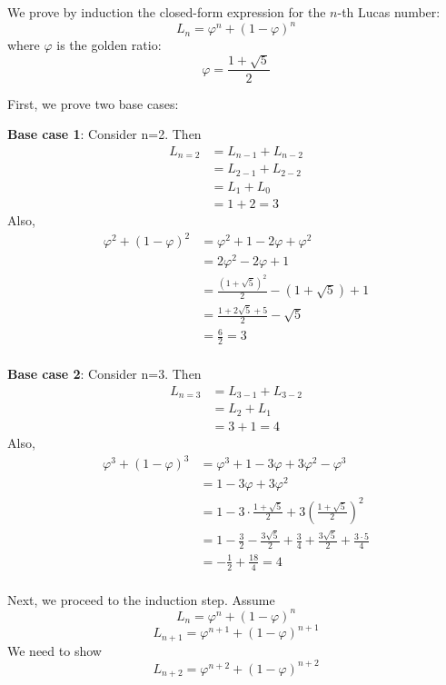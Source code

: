 \documentclass[paper=a4, fontsize=11pt]{scrartcl} %
\numberwithin{equation}{section} %
\numberwithin{figure}{section} %
\numberwithin{table}{section} %
\begin{document}
We prove by induction the closed-form expression for the $n$-th Lucas number:
\[L_n = \varphi^n + (1-\varphi)^n\]
where $\varphi$ is the golden ratio:
\[\varphi = \frac{1 + \sqrt{5}}{2}\]

First, we prove two base cases:

\textbf{Base case 1}: Consider n=2. Then
\begin{align*}
L_{n = 2} &= L_{n - 1} + L_{n - 2} \\
	&= L_{2 - 1} + L_{2 - 2} \\
	&= L_{1} + L_{0} \\
	&= 1 + 2 = 3
\end{align*}
Also, 
\begin{align*}
\varphi^2 + (1-\varphi)^2 &= \varphi^2 + 1 - 2\varphi + \varphi^2 \\ 
	&= 2\varphi^2 - 2\varphi + 1 \\
	&= \frac{(1+\sqrt{5})^2}{2} - (1+\sqrt{5}) + 1 \\
	&= \frac{1+2\sqrt{5} +5}{2} - \sqrt{5} \\
	&= \frac{6}{2} = 3\\
\end{align*}

\textbf{Base case 2}: Consider n=3. Then
\begin{align*}
L_{n = 3} &= L_{3 - 1} + L_{3 - 2} \\
	&= L_{2} + L_{1} \\
	&= 3 + 1 = 4
\end{align*}
Also, 
\begin{align*}
\varphi^3 + (1-\varphi)^3 &= \varphi^3 + 1 - 3\varphi + 3\varphi^2 - \varphi^3 \\ 
	&= 1 - 3\varphi +3 \varphi^2 \\
	&= 1 - 3 \cdot \frac{1+\sqrt{5}}{2} + 3 \left(\frac{1+\sqrt{5}}{2}\right)^2 \\
	&= 1 - \frac{3}{2} - \frac{3\sqrt{5}}{2} +\frac{3}{4} + \frac{3\sqrt{5}}{2} + \frac{3\cdot5}{4} \\
	&= -\frac{1}{2} + \frac{18}{4} = 4\\
\end{align*}

Next, we proceed to the induction step. Assume
\[L_{n} = \varphi^n + (1 - \varphi)^n\]
\[L_{n+1} = \varphi^{n+1} + (1 - \varphi)^{n+1}\]
We need to show
\[L_{n+2} = \varphi^{n+2} + (1 - \varphi)^{n+2}\]
\end{document}
